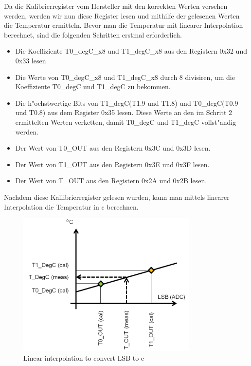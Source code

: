 Da die Kalibrierregister vom Hersteller mit den korrekten Werten versehen werden, werden wir nun diese Register lesen und mithilfe der gelesenen Werten die Temperatur ermitteln. Bevor man die Temperatur mit linearer Interpolation berechnet, sind die folgenden Schritten erstmal erforderlich.

\begin{itemize}
	\item Die Koeffiziente T0\_degC\_x8 und T1\_degC\_x8 aus den Registern 0x32 und 0x33 lesen
	\item Die Werte von T0\_degC\_x8 und T1\_degC\_x8 durch 8 divisiren, um die Koeffiziente T0\_degC und T1\_degC zu bekommen.
	\item Die h"ochstwertige Bits von T1\_degC(T1.9 und T1.8) und T0\_degC(T0.9 und T0.8) aus dem Register 0x35 lesen. Diese Werte an den im Schritt 2 ermittelten Werten verketten, damit T0\_degC und T1\_degC vollst"andig werden.
	\item Der Wert von T0\_OUT aus den Registern 0x3C und 0x3D lesen.
	\item Der Wert von T1\_OUT aus den Registern 0x3E und 0x3F lesen.
	\item Der Wert von T\_OUT aus den Registern 0x2A und 0x2B lesen.
	 	
\end{itemize}

Nachdem diese Kallibrierregister gelesen wurden, kann man mittels linearer Interpolation die Temperatur in \textdegree{}c berechnen.

\begin{figure}[h]
	\centering
	\includegraphics[width=9cm]{source/images/Temp}
	\caption{Linear interpolation to convert LSB to \textdegree{}c \cite{HTS221}}\label{graph:T}
\end{figure}

\vspace{3cm}

